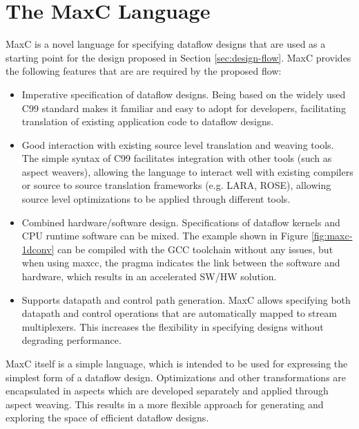 \section{The  MaxC Language}
\label{sec:maxc}

MaxC is a novel language for specifying dataflow designs that are used
as a starting point for the design proposed in Section
\ref{sec:design-flow}. MaxC provides the following features that are
are required by the proposed flow:

\begin{itemize}
\item Imperative specification of dataflow designs. Being based on the
  widely used C99 standard makes it familiar and easy to adopt for
  developers, facilitating translation of existing application code to
  dataflow designs.
\item Good interaction with existing source level translation and
  weaving tools. The simple syntax of C99 facilitates integration with
  other tools (such as aspect weavers), allowing the language to
  interact well with existing compilers or source to source
  translation frameworks (e.g. LARA, ROSE), allowing source level
  optimizations to be applied through different tools.
\item Combined hardware/software design. Specifications of dataflow
  kernels and CPU runtime software can be mixed. The example shown in
  Figure \ref{fig:maxc-1dconv} can be compiled with the GCC toolchain
  without any issues, but when using maxcc, the pragma indicates the
  link between the software and hardware, which results in an
  accelerated SW/HW solution.
\item Supports datapath and control path generation. MaxC allows
  specifying both datapath and control operations that are
  automatically mapped to stream multiplexers. This increases the
  flexibility in specifying designs without degrading performance.
\end{itemize}

MaxC itself is a simple language, which is intended to be used for
expressing the simplest form of a dataflow design. Optimizations and
other transformations are encapsulated in aspects which are developed
separately and applied through aspect weaving. This results in a more
flexible approach for generating and exploring the space of efficient
dataflow designs.

